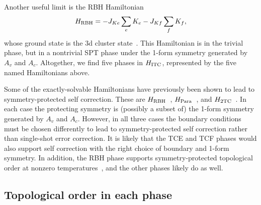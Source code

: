 Another useful limit is the RBH Hamiltonian
\begin{align}
H_{\text{RBH}} = - J_{Ke} \sum_e K_e - J_{Kf} \sum_f K_f, \label{eqn:H-RBH}
\end{align}
whose ground state is the 3d cluster state~\cite{Raussendorf2005LongRange}. This Hamiltonian is in the trivial phase, but in a nontrivial SPT phase under the 1-form symmetry generated by $A_v$ and $A_c$.
Altogether, we find five phases in $H_{\text{ITC}}$, represented by the five named Hamiltonians above.

Some of the exactly-solvable Hamiltonians have previously been shown to lead to symmetry-protected self correction. These are $H_{\text{RBH}}$~\cite{RobertsBartlett2020}, $H_{\text{Para}}$~\cite{StahlNandkishore2021}, and $H_{\text{2TC}}$~\cite{Stahl2022Symmetry}. In each case the protecting symmetry is (possibly a subset of) the 1-form symmetry generated by $A_v$ and $A_c$. However, in all three cases the boundary conditions must be chosen differently to lead to symmetry-protected self correction rather than single-shot error correction. It is likely that the TCE and TCF phases would also support self correction with the right choice of boundary and 1-form symmetry. In addition, the RBH phase supports symmetry-protected topological order at nonzero temperatures~\cite{Roberts2017SPTO}, and the other phases likely do as well.

\subsection{Topological order in each phase} \label{sub:topological-order}

